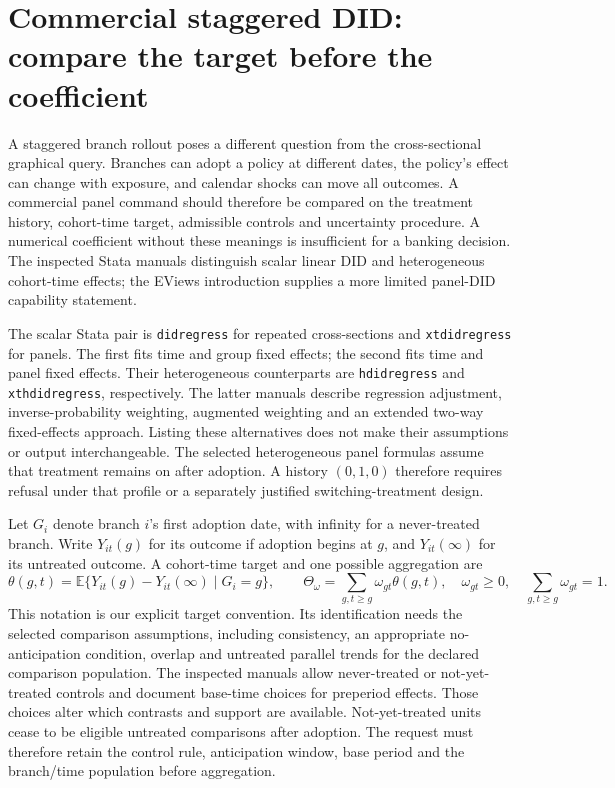 \section{Commercial staggered DID: compare the target before the coefficient}
\label{exec18:gp-panel}

A staggered branch rollout poses a different question from the cross-sectional
graphical query. Branches can adopt a policy at different dates, the policy's
effect can change with exposure, and calendar shocks can move all outcomes.
A commercial panel command should therefore be compared on the treatment
history, cohort-time target, admissible controls and uncertainty procedure.
A numerical coefficient without these meanings is insufficient for a banking
decision. The inspected Stata manuals distinguish scalar linear DID and
heterogeneous cohort-time effects; the EViews introduction supplies a more
limited panel-DID capability statement.
\citep{exec18_gp_stata_did,exec18_gp_stata_hdid,exec18_gp_stata_xthdid,exec18_gp_eviews}

The scalar Stata pair is \texttt{didregress} for repeated cross-sections and
\texttt{xtdidregress} for panels. The first fits time and group fixed effects;
the second fits time and panel fixed effects. Their heterogeneous counterparts
are \texttt{hdidregress} and \texttt{xthdidregress}, respectively. The latter
manuals describe regression adjustment, inverse-probability weighting,
augmented weighting and an extended two-way fixed-effects approach. Listing
these alternatives does not make their assumptions or output interchangeable.
The selected heterogeneous panel formulas assume that treatment remains on
after adoption. A history \((0,1,0)\) therefore requires refusal under that
profile or a separately justified switching-treatment design.
\citep{exec18_gp_stata_did,exec18_gp_stata_hdid,exec18_gp_stata_xthdid}

Let \(G_i\) denote branch \(i\)'s first adoption date, with infinity for a
never-treated branch. Write \(Y_{it}(g)\) for its outcome if adoption begins
at \(g\), and \(Y_{it}(\infty)\) for its untreated outcome. A cohort-time
target and one possible aggregation are
\begin{equation}
\label{exec18:gp-cohort-target}
 \theta(g,t)=\mathbb E\{Y_{it}(g)-Y_{it}(\infty)\mid G_i=g\},
 \qquad \Theta_{\omega}=\sum_{g,t\geq g}\omega_{gt}\theta(g,t),
 \quad \omega_{gt}\geq0,\quad\sum_{g,t\geq g}\omega_{gt}=1.
\end{equation}
This notation is our explicit target convention. Its identification needs
the selected comparison assumptions, including consistency, an appropriate
no-anticipation condition, overlap and untreated parallel trends for the
declared comparison population. The inspected manuals allow never-treated
or not-yet-treated controls and document base-time choices for preperiod
effects. Those choices alter which contrasts and support are available.
Not-yet-treated units cease to be eligible untreated comparisons after
adoption. The request must therefore retain the control rule, anticipation
window, base period and the branch/time population before aggregation.
\citep{exec18_gp_stata_hdid,exec18_gp_stata_xthdid}

